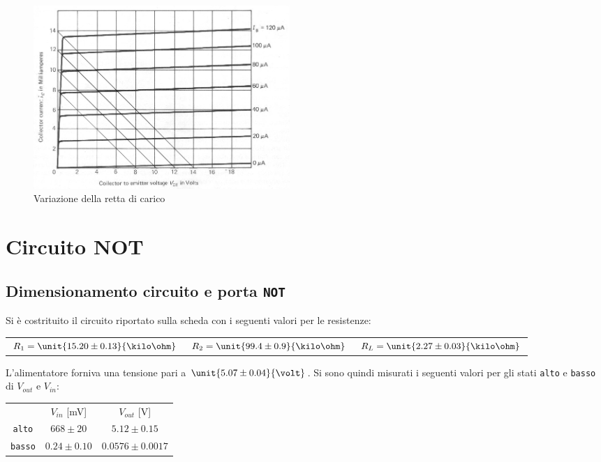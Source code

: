 \documentclass[10pt,a4paper]{article}
\def\code#1{\texttt{#1}}
\begin{document}
\begin{figure}[h!]
	\centering
	\includegraphics[width=0.47\textwidth]{../grafici/spostamento_retta.jpg}
	\caption{Variazione della retta di carico}
	\label{retta_spostamento}
\end{figure}

\section{Circuito NOT}

\subsection{Dimensionamento circuito e porta \code{NOT}}

Si è costrituito il circuito riportato sulla scheda con i seguenti valori per le resistenze:

\begin{table}[h!]
\centering
\begin{tabular}{c|c|c}
$R_1 = \unit{15.20 \pm 0.13}{\kilo\ohm}$ & $R_2 = \unit{99.4 \pm 0.9}{\kilo\ohm}$ & $R_L = \unit{2.27 \pm 0.03}{\kilo\ohm}$
\end{tabular}
\end{table}

L'alimentatore forniva una tensione pari a $\unit{5.07 \pm 0.04}{\volt}$.
Si sono quindi misurati i seguenti valori per gli stati \code{alto} e \code{basso} di $V_{out}$ e $V_{in}$:

\begin{table}[h!]
\centering
\begin{tabular}{c|c|c}
 & $V_{in}$ [mV]& $V_{out}$ [V]\\
\code{alto} & $668 \pm 20$ & $5.12 \pm 0.15$\\
\code{basso} & $0.24 \pm 0.10$ & $0.0576 \pm 0.0017$
\end{tabular}
\end{table}
\end{document}
